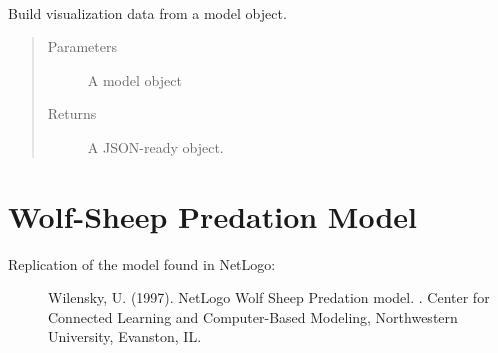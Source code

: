 \documentclass[letterpaper,10pt,english]{sphinxmanual}
\begin{document}
\begin{fulllineitems}
\label{\detokenize{index:examples.virus_on_network.virus_on_network.server.MyTextElement}}~

\begin{fulllineitems}
\label{\detokenize{index:examples.virus_on_network.virus_on_network.server.MyTextElement.render}}
Build visualization data from a model object.
\begin{quote}\begin{description}
\item[{Parameters}] \leavevmode
{} \textendash{} A model object

\item[{Returns}] \leavevmode
A JSON-ready object.

\end{description}\end{quote}

\end{fulllineitems}


\end{fulllineitems}

\label{\detokenize{index:module-examples.wolf_sheep.wolf_sheep.model}}

\chapter{Wolf-Sheep Predation Model}
\label{\detokenize{index:wolf-sheep-predation-model}}\begin{description}
\item[{Replication of the model found in NetLogo:}] \leavevmode
Wilensky, U. (1997). NetLogo Wolf Sheep Predation model.
.
Center for Connected Learning and Computer-Based Modeling,
Northwestern University, Evanston, IL.

\end{description}
\end{document}

